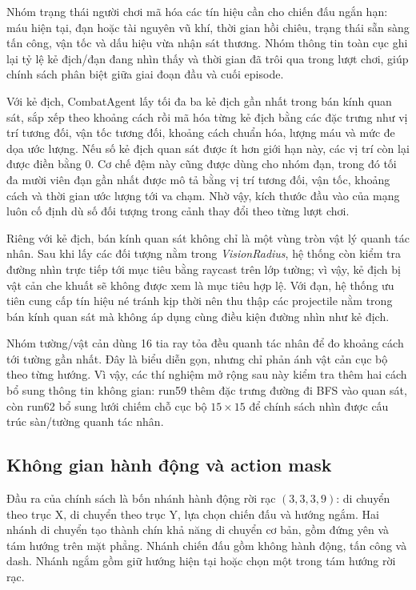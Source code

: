 Nhóm trạng thái người chơi mã hóa các tín hiệu cần cho chiến đấu ngắn hạn: máu hiện tại, đạn hoặc tài nguyên vũ khí, thời gian hồi chiêu, trạng thái sẵn sàng tấn công, vận tốc và dấu hiệu vừa nhận sát thương. Nhóm thông tin toàn cục ghi lại tỷ lệ kẻ địch/đạn đang nhìn thấy và thời gian đã trôi qua trong lượt chơi, giúp chính sách phân biệt giữa giai đoạn đầu và cuối episode.

Với kẻ địch, CombatAgent lấy tối đa ba kẻ địch gần nhất trong bán kính quan sát, sắp xếp theo khoảng cách rồi mã hóa từng kẻ địch bằng các đặc trưng như vị trí tương đối, vận tốc tương đối, khoảng cách chuẩn hóa, lượng máu và mức đe dọa ước lượng. Nếu số kẻ địch quan sát được ít hơn giới hạn này, các vị trí còn lại được điền bằng 0. Cơ chế đệm này cũng được dùng cho nhóm đạn, trong đó tối đa mười viên đạn gần nhất được mô tả bằng vị trí tương đối, vận tốc, khoảng cách và thời gian ước lượng tới va chạm. Nhờ vậy, kích thước đầu vào của mạng luôn cố định dù số đối tượng trong cảnh thay đổi theo từng lượt chơi.

Riêng với kẻ địch, bán kính quan sát không chỉ là một vùng tròn vật lý quanh tác nhân. Sau khi lấy các đối tượng nằm trong \emph{VisionRadius}, hệ thống còn kiểm tra đường nhìn trực tiếp tới mục tiêu bằng raycast trên lớp tường; vì vậy, kẻ địch bị vật cản che khuất sẽ không được xem là mục tiêu hợp lệ. Với đạn, hệ thống ưu tiên cung cấp tín hiệu né tránh kịp thời nên thu thập các projectile nằm trong bán kính quan sát mà không áp dụng cùng điều kiện đường nhìn như kẻ địch.

Nhóm tường/vật cản dùng 16 tia ray tỏa đều quanh tác nhân để đo khoảng cách tới tường gần nhất. Đây là biểu diễn gọn, nhưng chỉ phản ánh vật cản cục bộ theo từng hướng. Vì vậy, các thí nghiệm mở rộng sau này kiểm tra thêm hai cách bổ sung thông tin không gian: run59 thêm đặc trưng đường đi BFS vào quan sát, còn run62 bổ sung lưới chiếm chỗ cục bộ $15\times15$ để chính sách nhìn được cấu trúc sàn/tường quanh tác nhân.

\subsection{Không gian hành động và action mask}

Đầu ra của chính sách là bốn nhánh hành động rời rạc $(3,3,3,9)$: di chuyển theo trục X, di chuyển theo trục Y, lựa chọn chiến đấu và hướng ngắm. Hai nhánh di chuyển tạo thành chín khả năng di chuyển cơ bản, gồm đứng yên và tám hướng trên mặt phẳng. Nhánh chiến đấu gồm không hành động, tấn công và dash. Nhánh ngắm gồm giữ hướng hiện tại hoặc chọn một trong tám hướng rời rạc.

